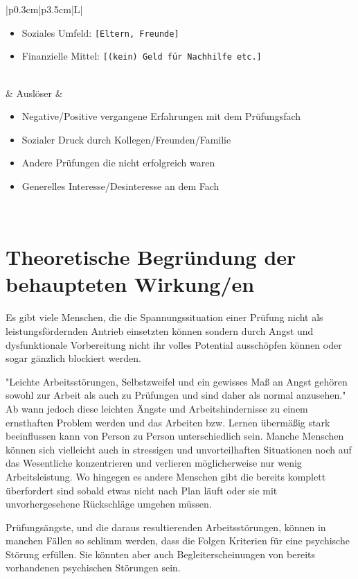 \documentclass[11pt, a4paper]{article}
\begin{document}
\begin{table}[h!]
\begin{tabularx}{\textwidth}{|p{0.3cm}|p{3.5cm}|L|}
\begin{itemize}[noitemsep, topsep=0pt]
			\item Soziales Umfeld: \texttt{[Eltern, Freunde]}
			\item Finanzielle Mittel: \texttt{[(kein) Geld für Nachhilfe etc.]}
		\end{itemize} \\
		 & Auslöser                               & 
		\begin{itemize}[noitemsep, topsep=0pt]
			\item Negative/Positive vergangene Erfahrungen mit dem Prüfungsfach
			\item Sozialer Druck durch Kollegen/Freunden/Familie
			\item Andere Prüfungen die nicht erfolgreich waren
			\item Generelles Interesse/Desinteresse an dem Fach
		\end{itemize} \\
		\hline
	\end{tabularx}
\end{table}
\newpage
\section*{Theoretische Begründung der behaupteten Wirkung/en}
Es gibt viele Menschen, die die Spannungssituation einer Prüfung nicht als leistungsfördernden Antrieb einsetzten können sondern durch Angst und dysfunktionale Vorbereitung nicht ihr volles Potential ausschöpfen können oder sogar gänzlich blockiert werden. \cite{Holm-Hadulla2009}

"Leichte Arbeitsstörungen, Selbstzweifel und ein gewisses Maß an Angst gehören sowohl zur Arbeit als auch zu Prüfungen und sind daher als normal anzusehen." \cite{Holm-Hadulla2009} Ab wann jedoch diese leichten Ängste und Arbeitshindernisse zu einem ernsthaften Problem werden und das Arbeiten bzw. Lernen übermäßig stark beeinflussen kann von Person zu Person unterschiedlich sein. Manche Menschen können sich vielleicht auch in stressigen und unvorteilhaften Situationen noch auf das Wesentliche konzentrieren und verlieren möglicherweise nur wenig Arbeitsleistung. Wo hingegen es andere Menschen gibt die bereits komplett überfordert sind sobald etwas nicht nach Plan läuft oder sie mit unvorhergesehene Rückschläge umgehen müssen.

Prüfungsängste, und die daraus resultierenden Arbeitsstörungen, können in manchen Fällen so schlimm werden, dass die Folgen Kriterien für eine psychische Störung erfüllen. Sie könnten aber auch Begleiterscheinungen von bereits vorhandenen psychischen Störungen sein. \cite{Holm-Hadulla2009}
\end{document}
